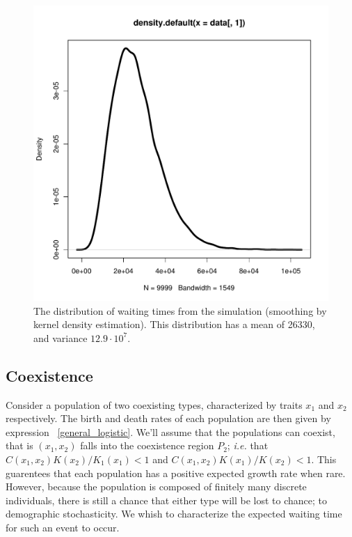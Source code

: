 \documentclass[authoryear,review,11pt]{elsarticle}
\begin{document}
\begin{figure}
\begin{center}
\includegraphics[width=.9\textwidth]{images/waittimes}
\caption{The distribution of waiting times from the simulation (smoothing by kernel density estimation).   This distribution has a mean of 26330, and variance $12.9\cdot 10^7$.}
\end{center}
\end{figure}




\subsection{Coexistence}
Consider a population of two coexisting types, characterized by traits $x_1$ and $x_2$ respectively.  The birth and death rates of each population are then given by expression ~\eqref{general_logistic}.  We'll assume that the populations can coexist, that is $(x_1, x_2)$ falls into the coexistence region $P_2$; \emph{i.e.} that $C(x_1,x_2)K(x_2) /K_1(x_1) < 1 $ and $C(x_1, x_2) K(x_1)/K(x_2) < 1$.  This guarentees that each population has a positive expected growth rate when rare.  However, because the population is composed of finitely many discrete individuals, there is still a chance that either type will be lost to chance; to demographic stochasticity.  We whish to characterize the expected waiting time for such an event to occur. 
\end{document}
